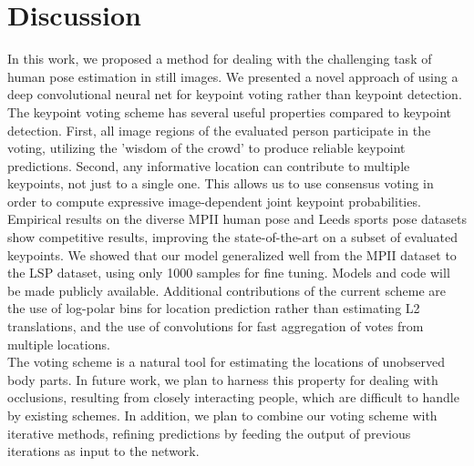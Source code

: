 \documentclass{article}
\begin{document}
\section{Discussion}
In this work, we proposed a method for dealing with the challenging task of human pose estimation in still images. We presented a novel approach of using a deep convolutional neural net for keypoint voting rather than keypoint detection. The keypoint voting scheme has several useful properties compared to keypoint detection. First, all image regions of the evaluated person participate in the voting, utilizing the 'wisdom of the crowd' to produce reliable keypoint predictions. Second, any informative location can contribute to multiple keypoints, not just to a single one. This allows us to use consensus voting in order to compute expressive image-dependent joint keypoint probabilities. Empirical results on the diverse MPII human pose and Leeds sports pose datasets show competitive results, improving the state-of-the-art on a subset of evaluated keypoints. We showed that our model generalized well from the MPII dataset to the LSP dataset, using only 1000 samples for fine tuning. Models and code will be made publicly available. Additional contributions of the current scheme are the use of log-polar bins for location prediction rather than estimating L2 translations, and the use of convolutions for fast aggregation of votes from multiple locations.\\




The voting scheme is a natural tool for estimating the locations of unobserved body parts. In future work, we plan to harness this property for dealing with occlusions, resulting from closely interacting people, which are difficult to handle by existing schemes. In addition, we plan to combine our voting scheme with iterative methods, refining predictions by feeding the output of previous iterations as input to the network.\\






\end{document}
